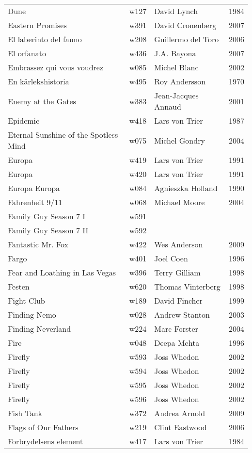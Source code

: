 \documentclass{article}
\begin{document}
\begin {center}
\begin{longtable}{p{10cm} l l l}
Dune & w127 & David Lynch & 1984 \\
Eastern Promises & w391 & David Cronenberg & 2007 \\
El laberinto del fauno & w208 & Guillermo del Toro & 2006 \\
El orfanato & w436 & J.A. Bayona & 2007 \\
Embrassez qui vous voudrez & w085 & Michel Blanc & 2002 \\
En kärlekshistoria & w495 & Roy Andersson & 1970 \\
Enemy at the Gates & w383 & Jean-Jacques Annaud & 2001 \\
Epidemic & w418 & Lars von Trier & 1987 \\
Eternal Sunshine of the Spotless Mind & w075 & Michel Gondry & 2004 \\
Europa & w419 & Lars von Trier & 1991 \\
Europa & w420 & Lars von Trier & 1991 \\
Europa Europa & w084 & Agnieszka Holland & 1990 \\
Fahrenheit 9/11 & w068 & Michael Moore & 2004 \\
Family Guy Season 7 I & w591 &  &  \\
Family Guy Season 7 II & w592 &  &  \\
Fantastic Mr. Fox & w422 & Wes Anderson & 2009 \\
Fargo & w401 & Joel Coen & 1996 \\
Fear and Loathing in Las Vegas & w396 & Terry Gilliam & 1998 \\
Festen & w620 & Thomas Vinterberg & 1998 \\
Fight Club & w189 & David Fincher & 1999 \\
Finding Nemo & w028 & Andrew Stanton & 2003 \\
Finding Neverland & w224 & Marc Forster & 2004 \\
Fire & w048 & Deepa Mehta & 1996 \\
Firefly & w593 & Joss Whedon & 2002 \\
Firefly & w594 & Joss Whedon & 2002 \\
Firefly & w595 & Joss Whedon & 2002 \\
Firefly & w596 & Joss Whedon & 2002 \\
Fish Tank & w372 & Andrea Arnold & 2009 \\
Flags of Our Fathers & w219 & Clint Eastwood & 2006 \\
Forbrydelsens element & w417 & Lars von Trier & 1984 \\

\end{longtable}
\end{center}
\end{document}
